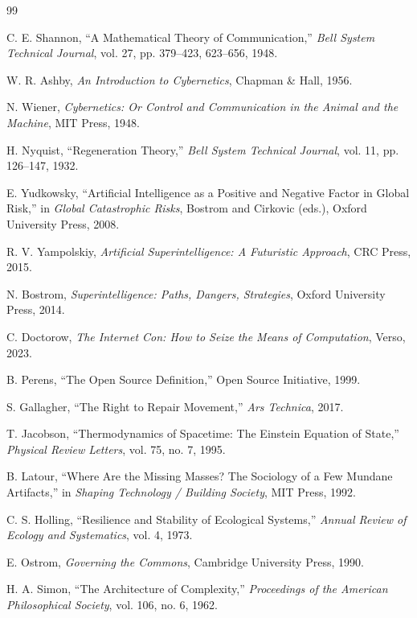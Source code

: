 \documentclass[11pt]{article}
\begin{document}
\newpage
\begin{thebibliography}{99}

C. E. Shannon,
``A Mathematical Theory of Communication,''
\emph{Bell System Technical Journal},
vol. 27, pp. 379--423, 623--656, 1948.

W. R. Ashby,
\emph{An Introduction to Cybernetics},
Chapman \& Hall, 1956.

N. Wiener,
\emph{Cybernetics: Or Control and Communication in the Animal and the Machine},
MIT Press, 1948.

H. Nyquist,
``Regeneration Theory,''
\emph{Bell System Technical Journal},
vol. 11, pp. 126--147, 1932.

E. Yudkowsky,
``Artificial Intelligence as a Positive and Negative Factor in Global Risk,''
in \emph{Global Catastrophic Risks},
Bostrom and Cirkovic (eds.),
Oxford University Press, 2008.

R. V. Yampolskiy,
\emph{Artificial Superintelligence: A Futuristic Approach},
CRC Press, 2015.

N. Bostrom,
\emph{Superintelligence: Paths, Dangers, Strategies},
Oxford University Press, 2014.

C. Doctorow,
\emph{The Internet Con: How to Seize the Means of Computation},
Verso, 2023.

B. Perens,
``The Open Source Definition,''
Open Source Initiative, 1999.

S. Gallagher,
``The Right to Repair Movement,''
\emph{Ars Technica},
2017.

T. Jacobson,
``Thermodynamics of Spacetime: The Einstein Equation of State,''
\emph{Physical Review Letters},
vol. 75, no. 7, 1995.

B. Latour,
``Where Are the Missing Masses? The Sociology of a Few Mundane Artifacts,''
in \emph{Shaping Technology / Building Society},
MIT Press, 1992.

C. S. Holling,
``Resilience and Stability of Ecological Systems,''
\emph{Annual Review of Ecology and Systematics},
vol. 4, 1973.

E. Ostrom,
\emph{Governing the Commons},
Cambridge University Press, 1990.

H. A. Simon,
``The Architecture of Complexity,''
\emph{Proceedings of the American Philosophical Society},
vol. 106, no. 6, 1962.

\end{thebibliography}
\end{document}
